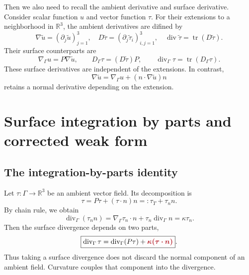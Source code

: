 \documentclass[11pt,a4paper]{article}
\newcommand{\curv}[1]{{\color{curvred}\bm{#1}}}
\newcommand{\G}{\Gamma}
\newcommand{\gradG}{\nabla_{\!\G}}
\newcommand{\divG}{\operatorname{div}_{\G}}
\newcommand{\DG}{D_{\G}}
\newcommand{\R}{\mathbb R}
\begin{document}
Then we also need to recall the ambient derivative and surface derivative. Consider scalar function $u$ and vector function $\tau$. 
For their extensions to a neighborhood in $\R^3$, the ambient derivatives are difined by
\begin{equation}
 \nabla\widetilde u=(\partial_j\widetilde u)_{j=1}^3,
 \quad D\widetilde\tau=(\partial_j\widetilde\tau_i)_{i,j=1}^3,
 \quad \operatorname{div}\widetilde\tau=\operatorname{tr}(D\widetilde\tau).
\end{equation}
Their surface counterparts are
\begin{equation}
 \gradG u=P\nabla\widetilde u,\qquad
 \DG\tau=(D\widetilde\tau)P,\qquad
 \divG\tau=\operatorname{tr}(\DG\tau).
 \label{eq:derivatives}
\end{equation}
These surface derivatives are independent of the extensions. In contrast,
\begin{equation}
    \nabla\widetilde u=\gradG u+(n\cdot\nabla\widetilde u)n
\end{equation} 
retains a normal derivative depending on the extension.

\section{Surface integration by parts and corrected weak form}
\label{sec:weak}
\subsection{The integration-by-parts identity}

Let $\tau:\G\to\R^3$ be an ambient vector field. Its decomposition is
\begin{equation}
  \tau=P\tau+(\tau\cdot n)n=:\tau_T+\tau_n n.
\end{equation}
By chain rule, we obtain
\[
    \divG(\tau_n n) =\gradG\tau_n\cdot n+\tau_n\divG n
    =\kappa\tau_n.
\]
Then the surface divergence depends on two parts,
\begin{equation}
\boxed{\divG\tau=\divG(P\tau)+\curv{\kappa(\tau\cdot n)}}.
 \label{eq:div-decomposition}
\end{equation}
Thus taking a surface divergence does not discard the normal component of an ambient field. Curvature couples that component into the divergence.
\end{document}
